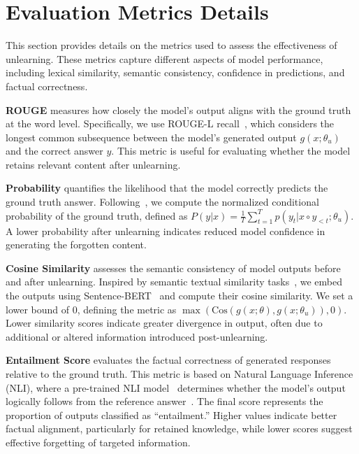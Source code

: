 \appendix
\newpage
\section{Evaluation Metrics Details}
\label{appendix:evaluationMetrics}This section provides details on the metrics used to assess the effectiveness of unlearning. These metrics capture different aspects of model performance, including lexical similarity, semantic consistency, confidence in predictions, and factual correctness.

\noindent
\textbf{ROUGE} measures how closely the model's output aligns with the ground truth at the word level. Specifically, we use ROUGE-L recall~\citep{lin2004rouge}, which considers the longest common subsequence between the model’s generated output $g(x;\theta_u)$ and the correct answer $y$. This metric is useful for evaluating whether the model retains relevant content after unlearning.

\noindent
\textbf{Probability} quantifies the likelihood that the model correctly predicts the ground truth answer. Following~\citet{maini2024tofu}, we compute the normalized conditional probability of the ground truth, defined as $P(y|x) = \frac{1}{T} \sum_{t=1}^{T} p(y_t|x \circ y_{<t}; \theta_u)$. A lower probability after unlearning indicates reduced model confidence in generating the forgotten content.

\noindent
\textbf{Cosine Similarity} assesses the semantic consistency of model outputs before and after unlearning. Inspired by semantic textual similarity tasks~\citep{cer-etal-2017-semeval}, we embed the outputs using Sentence-BERT~\citep{reimers-2019-sentence-bert} and compute their cosine similarity. We set a lower bound of 0, defining the metric as $\max(\text{Cos}(g(x;\theta), g(x;\theta_u)), 0)$. Lower similarity scores indicate greater divergence in output, often due to additional or altered information introduced post-unlearning.

\noindent
\textbf{Entailment Score} evaluates the factual correctness of generated responses relative to the ground truth. This metric is based on Natural Language Inference (NLI), where a pre-trained NLI model~\citep{sileo2023tasksource} determines whether the model's output logically follows from the reference answer~\citep{liu2024learning}. The final score represents the proportion of outputs classified as “entailment.” Higher values indicate better factual alignment, particularly for retained knowledge, while lower scores suggest effective forgetting of targeted information.

